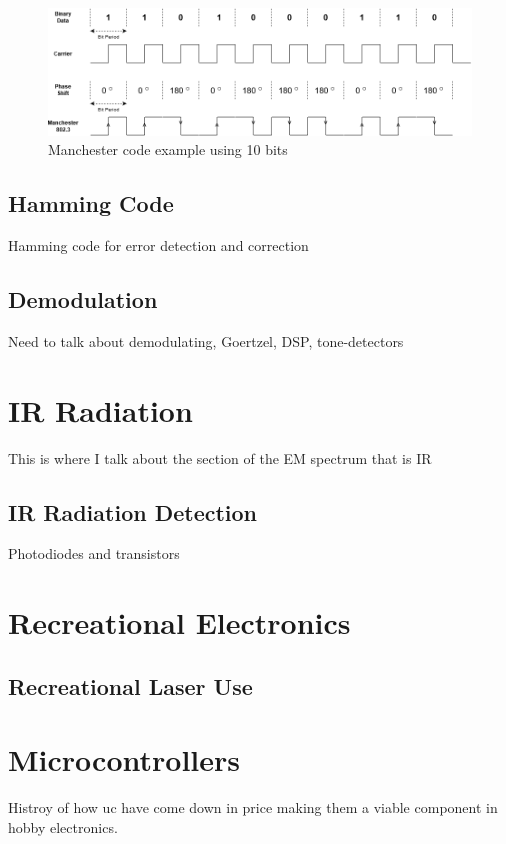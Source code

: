 \begin{figure}[H]
	\centering
	\includegraphics[width=0.7\linewidth]{figures/litreview/manchester_encoding}
	\caption{Manchester code example using 10 bits}
	\label{fig:manchesterencoding}
\end{figure}




\subsection{Hamming Code}
Hamming code for error detection and correction

\subsection{Demodulation}
Need to talk about demodulating, Goertzel, DSP, tone-detectors



\section{IR Radiation}
This is where I talk about the section of the EM spectrum that is IR


\subsection{IR Radiation Detection}

Photodiodes and transistors





\section{Recreational Electronics}


\subsection{Recreational Laser Use}

\section{Microcontrollers}
Histroy of how uc have come down in price making them a viable component in hobby electronics.

